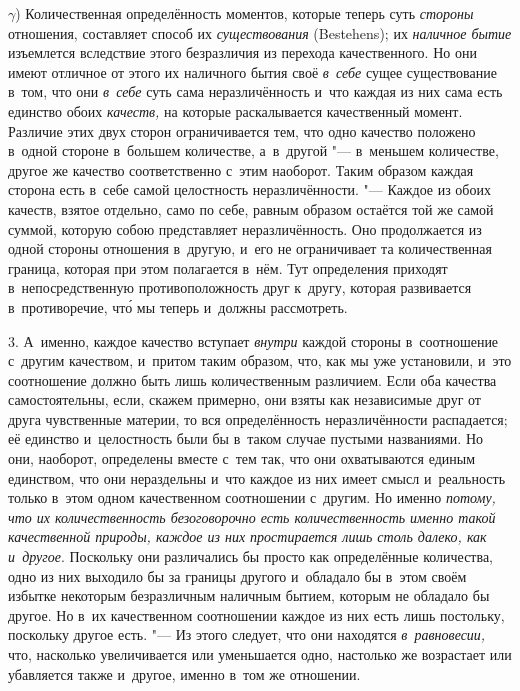 $\gamma$) Количественная определённость моментов, которые теперь суть
{\em стороны} отношения, составляет способ их {\em существования} (Be\-ste\-hens);
их {\em наличное бытие} изъемлется вследствие этого безразличия из перехода
качественного. Но они имеют отличное от этого их наличного бытия своё
{\em в~себе} сущее существование в~том, что они {\em в~себе} суть сама
неразличённость и~что каждая из них сама есть единство обоих {\em качеств,} на
которые раскалывается качественный момент. Различие этих двух сторон
ограничивается тем, что одно качество положено в~одной стороне в~большем
количестве, а~в~другой "--- в~меньшем количестве, другое же качество
соответственно с~этим наоборот. Таким образом каждая сторона есть в~себе самой
целостность неразличённости. "--- Каждое из обоих качеств, взятое отдельно,
само по себе, равным образом остаётся той же самой суммой, которую собою
представляет неразличённость. Оно продолжается из одной стороны отношения
в~другую, и~его не ограничивает та количественная граница, которая при этом
полагается в~нём. Тут определения приходят в~непосредственную противоположность
друг к~другу, которая развивается в~противоречие, чт\'{о} мы теперь и~должны
рассмотреть.

3. А~именно, каждое качество вступает {\em внутри} каждой стороны в~соотношение
с~другим качеством, и~притом таким образом, что, как мы уже установили, и~это
соотношение должно быть лишь количественным различием. Если оба качества
самостоятельны, если, скажем примерно, они взяты как независимые друг от друга
чувственные материи, то вся определённость неразличённости распадается; её
единство и~целостность были бы в~таком случае пустыми названиями. Но они,
наоборот, определены вместе с~тем так, что они охватываются единым единством,
что они нераздельны и~что каждое из них имеет смысл и~реальность только в~этом
одном качественном соотношении с~другим. Но именно {\em потому, что их
количественность безоговорочно есть количественность именно такой качественной
природы, каждое из них простирается лишь столь далеко, как и~другое}. Поскольку
они различались бы просто как определённые количества, одно из них выходило бы
за границы другого и~обладало бы в~этом своём избытке некоторым безразличным
наличным бытием, которым не обладало бы другое. Но в~их качественном
соотношении каждое из них есть лишь постольку, поскольку другое есть. "--- Из
этого следует, что они находятся {\em в~равновесии,} что, насколько
увеличивается или уменьшается одно, настолько же возрастает или убавляется
также и~другое, именно в~том же отношении.

